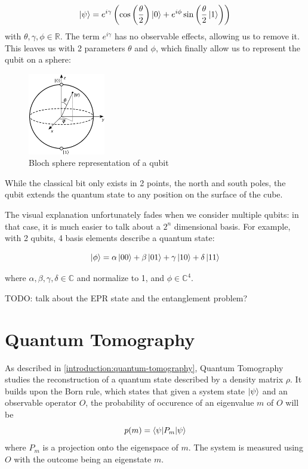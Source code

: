 \documentclass[12pt]{memoir}
\begin{document}
\begin{equation}
    \ket \psi = e^{i\gamma}\left( \cos\left(\frac{\theta}{2}\right)\ket 0 + e^{i\phi} \sin\left(\frac{\theta}{2}\ket 1\right)\right)
\end{equation}
with $\theta,\gamma,\phi \in \mathbb{R}$. The term $e^{i\gamma}$ has no observable effects, allowing us to remove it. This leaves us with 2 parameters $\theta$ and $\phi$, which finally allow us to represent the qubit on a sphere:

\begin{figure}[H]
    \centering
    \includegraphics[width=0.3\textwidth]{figures/bloch_sphere.png}
    \caption{Bloch sphere representation of a qubit}
    \label{fig:bloch-sphere}
\end{figure}
While the classical bit only exists in 2 points, the north and south poles, the qubit extends the quantum state to any position on the surface of the cube. \cite{wiki:qubit,book:Nielsen-Chuang-2010}\medbreak

The visual explanation unfortunately fades when we consider multiple qubits: in that case, it is much easier to talk about a $2^n$ dimensional basis. For example, with 2 qubits, 4 basis elements describe a quantum state:

\begin{equation}
    \ket{\phi} = \alpha \ket{00} + \beta \ket{01} + \gamma \ket{10} + \delta \ket{11}
\end{equation}

where $\alpha,\beta,\gamma,\delta \in \mathbb C$ and normalize to 1, and $\phi \in \mathbb{C}^4$.\medbreak

TODO: talk about the EPR state and the entanglement problem?
\section{Quantum Tomography}
As described in \ref{introduction:quantum-tomography}, Quantum Tomography studies the reconstruction of a quantum state described by a density matrix $\rho$. It builds upon the Born rule, which states that given a system state $\ket \psi$ and an observable operator $O$, the probability of occurence of an eigenvalue $m$ of $O$ will be 
\begin{equation}
    p(m) = \braket{\psi | P_m| \psi}
\end{equation}
where $P_m$ is a projection onto the eigenspace of $m$. The system is measured using $O$ with the outcome being an eigenstate $m$.\medbreak
\end{document}
